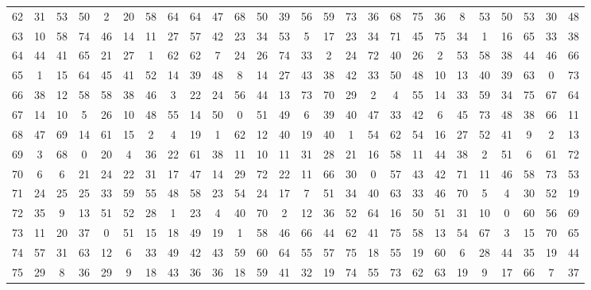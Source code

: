 \begin{table}
\begin{tabular}{c c c c c c c c c c c c c c c c c c c c c c c c c c }
62 & 31 & 53 & 50 & 2 & 20 & 58 & 64 & 64 & 47 & 68 & 50 & 39 & 56 & 59 & 73 & 36 & 68 & 75 & 36 & 8 & 53 & 50 & 53 & 30 & 48 \\
63 & 10 & 58 & 74 & 46 & 14 & 11 & 27 & 57 & 42 & 23 & 34 & 53 & 5 & 17 & 23 & 34 & 71 & 45 & 75 & 34 & 1 & 16 & 65 & 33 & 38 \\
64 & 44 & 41 & 65 & 21 & 27 & 1 & 62 & 62 & 7 & 24 & 26 & 74 & 33 & 2 & 24 & 72 & 40 & 26 & 2 & 53 & 58 & 38 & 44 & 46 & 66 \\
65 & 1 & 15 & 64 & 45 & 41 & 52 & 14 & 39 & 48 & 8 & 14 & 27 & 43 & 38 & 42 & 33 & 50 & 48 & 10 & 13 & 40 & 39 & 63 & 0 & 73 \\
66 & 38 & 12 & 58 & 58 & 38 & 46 & 3 & 22 & 24 & 56 & 44 & 13 & 73 & 70 & 29 & 2 & 4 & 55 & 14 & 33 & 59 & 34 & 75 & 67 & 64 \\
67 & 14 & 10 & 5 & 26 & 10 & 48 & 55 & 14 & 50 & 0 & 51 & 49 & 6 & 39 & 40 & 47 & 33 & 42 & 6 & 45 & 73 & 48 & 38 & 66 & 11 \\
68 & 47 & 69 & 14 & 61 & 15 & 2 & 4 & 19 & 1 & 62 & 12 & 40 & 19 & 40 & 1 & 54 & 62 & 54 & 16 & 27 & 52 & 41 & 9 & 2 & 13 \\
69 & 3 & 68 & 0 & 20 & 4 & 36 & 22 & 61 & 38 & 11 & 10 & 11 & 31 & 28 & 21 & 16 & 58 & 11 & 44 & 38 & 2 & 51 & 6 & 61 & 72 \\
70 & 6 & 6 & 21 & 24 & 22 & 31 & 17 & 47 & 14 & 29 & 72 & 22 & 11 & 66 & 30 & 0 & 57 & 43 & 42 & 71 & 11 & 46 & 58 & 73 & 53 \\
71 & 24 & 25 & 25 & 33 & 59 & 55 & 48 & 58 & 23 & 54 & 24 & 17 & 7 & 51 & 34 & 40 & 63 & 33 & 46 & 70 & 5 & 4 & 30 & 52 & 19 \\
72 & 35 & 9 & 13 & 51 & 52 & 28 & 1 & 23 & 4 & 40 & 70 & 2 & 12 & 36 & 52 & 64 & 16 & 50 & 51 & 31 & 10 & 0 & 60 & 56 & 69 \\
73 & 11 & 20 & 37 & 0 & 51 & 15 & 18 & 49 & 19 & 1 & 58 & 46 & 66 & 44 & 62 & 41 & 75 & 58 & 13 & 54 & 67 & 3 & 15 & 70 & 65 \\
74 & 57 & 31 & 63 & 12 & 6 & 33 & 49 & 42 & 43 & 59 & 60 & 64 & 55 & 57 & 75 & 18 & 55 & 19 & 60 & 6 & 28 & 44 & 35 & 19 & 44 \\
75 & 29 & 8 & 36 & 29 & 9 & 18 & 43 & 36 & 36 & 18 & 59 & 41 & 32 & 19 & 74 & 55 & 73 & 62 & 63 & 19 & 9 & 17 & 66 & 7 & 37 \\
\hline
\end{tabular}
\end{table}